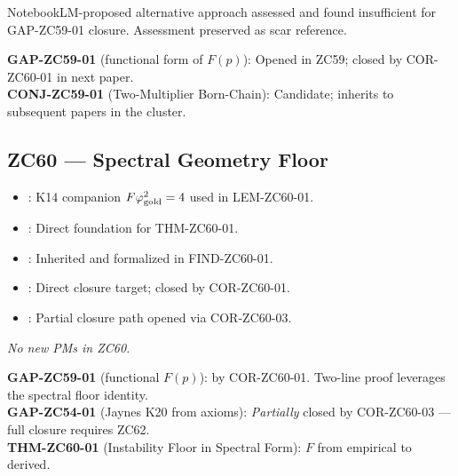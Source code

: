 \documentclass[12pt, a4paper]{article}
\begin{document}
\begin{correctionbox}[title={ZC59 Forward Corrections / PMs}]
\begin{description}[leftmargin=1.5em]
\item[\pmdiamond{ZC59-01}] NotebookLM-proposed alternative approach
  assessed and found insufficient for GAP-ZC59-01 closure. Assessment
  preserved as scar reference.
\end{description}
\end{correctionbox}

\begin{conmapbox}[title={ZC59 Open / Candidate Record}]
\textbf{GAP-ZC59-01} (functional form of $F(p)$): Opened in ZC59;
closed by COR-ZC60-01 in next paper.\\[0.2em]
\textbf{CONJ-ZC59-01} (Two-Multiplier Born-Chain): Candidate;
inherits to subsequent papers in the cluster.
\end{conmapbox}

\subsection{ZC60 --- Spectral Geometry Floor}

\begin{inheritbox}[title={ZC60 Backward Inheritance}]
\begin{itemize}[leftmargin=1.5em]
\item {}: K14 companion
  $F\varphi_{\rm gold}^{2}=4$ used in LEM-ZC60-01.
\item {}: Direct foundation for THM-ZC60-01.
\item {}: Inherited and formalized in FIND-ZC60-01.
\item {}: Direct closure
  target; closed by COR-ZC60-01.
\item {}: Partial closure path opened
  via COR-ZC60-03.
\end{itemize}
\end{inheritbox}

\begin{correctionbox}[title={ZC60 Forward Corrections / PMs}]
\textit{No new PMs in ZC60.}
\end{correctionbox}

\begin{conmapbox}[title={ZC60 Closure Record}]
\textbf{GAP-ZC59-01} (functional $F(p)$): \closedcheck{} by
COR-ZC60-01. Two-line proof leverages the spectral floor identity.\\[0.2em]
\textbf{GAP-ZC54-01} (Jaynes K20 from axioms): \emph{Partially}
closed by COR-ZC60-03 --- full closure requires ZC62.\\[0.2em]
\textbf{THM-ZC60-01} (Instability Floor in Spectral Form):
\promotedstar{} $F$ from empirical to derived.
\end{conmapbox}
\end{document}
